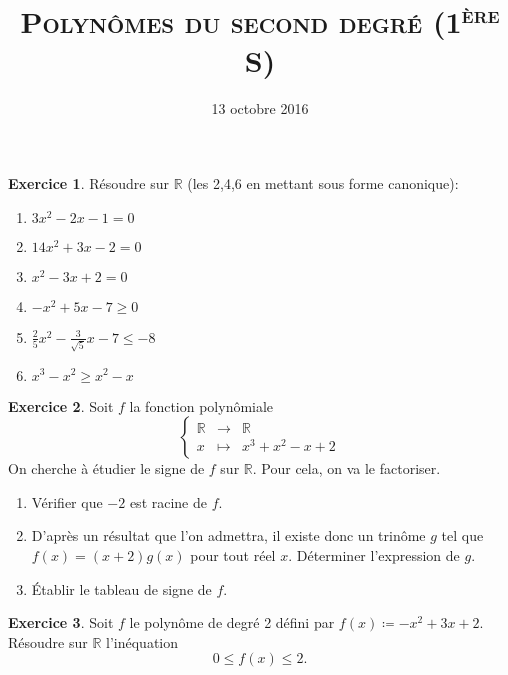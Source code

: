 \documentclass{article}
\title{\textsc{Polynômes du second degré (1\textsuperscript{ère} S)} }
\author{}
\date{13 octobre 2016}
\theoremstyle{definition}
\newtheorem{exo}{Exercice}
\newcommand{\R}{\mathbb R}
\begin{document}
\maketitle

\begin{exo} Résoudre sur $\R$ (les 2,4,6 en mettant sous forme canonique):
    \begin{multicols}{2}
        \begin{enumerate}
            \item $3x^2-2x-1=0$
            \item $14x^2 + 3x - 2 = 0$
            \item $x^2 - 3x + 2 = 0$
            \item $-x^2 + 5x - 7 \geq 0$
            \item $\frac{2}{5}x^2 - \frac{3}{\sqrt{5}}x - 7 \leq -8$
            \item $x^3-x^2 \geq x^2 -x$
        \end{enumerate}
    \end{multicols}
\end{exo}

\begin{exo} Soit $f$ la fonction polynômiale
    \begin{equation*}
        \left\{\begin{array}{lcl}
            \R &\longrightarrow &\R \\
            x &\longmapsto & x^3 + x^2 - x + 2
        \end{array}\right.
    \end{equation*}
    On cherche à étudier le signe de $f$ sur $\R$. Pour cela, on va le factoriser.
    \begin{enumerate}
        \item Vérifier que $-2$ est racine de $f$.
        \item D'après un résultat que l'on admettra, il existe donc un trinôme $g$ tel que $f(x) = (x+2)g(x)$ pour tout réel $x$. Déterminer l'expression de $g$.
        \item Établir le tableau de signe de $f$.
    \end{enumerate}
\end{exo}

\begin{exo}
    Soit $f$ le polynôme de degré 2 défini par $f(x)\coloneqq -x^2+3x+2$. Résoudre sur $\R$ l'inéquation
    \[
    0\leq f(x) \leq 2.
    \]
\end{exo}
\end{document}
